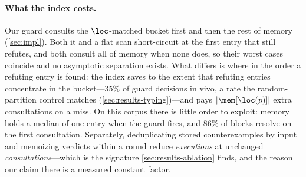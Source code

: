\paragraph{What the index costs.}
Our guard consults the $\loc$-matched bucket first and then the rest of memory
(\cref{sec:impl}). Both it and a flat scan short-circuit at the first entry
that still refutes, and both consult all of memory when none does, so their
worst cases coincide and no asymptotic separation exists. What differs is where
in the order a refuting entry is found: the index saves to the extent that
refuting entries concentrate in the bucket---$35\%$ of guard decisions in vivo,
a rate the random-partition control matches (\cref{sec:results-typing})---and
pays $\lvert\mem[\loc(p)]\rvert$ extra consultations on a miss. On this corpus
there is little order to exploit: memory holds a median of one entry when the
guard fires, and $86\%$ of blocks resolve on the first consultation. Separately, deduplicating stored
counterexamples by input and memoizing verdicts within a round reduce
\emph{executions} at unchanged \emph{consultations}---which is the signature
\cref{sec:results-ablation} finds, and the reason our claim there is a measured
constant factor.
